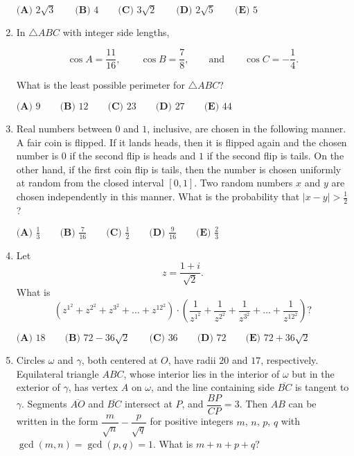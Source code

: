 \documentclass{article}
\begin{document}
\begin{enumerate}[label=\arabic*., itemsep=0.5em]
\(
\textbf{(A) }2\sqrt{3}\qquad
\textbf{(B) }4\qquad
\textbf{(C) }3\sqrt{2}\qquad
\textbf{(D) }2\sqrt{5}\qquad
\textbf{(E) }5\qquad
\)\par \vspace{0.5em}\item In \(\triangle ABC\) with integer side lengths,

\begin{equation*}
\cos A=\frac{11}{16}, \qquad \cos B= \frac{7}{8}, \qquad \text{and} \qquad\cos C=-\frac{1}{4}.
\end{equation*}

What is the least possible perimeter for \(\triangle ABC\)?

\(\textbf{(A) } 9 \qquad \textbf{(B) } 12 \qquad \textbf{(C) } 23 \qquad \textbf{(D) } 27 \qquad \textbf{(E) } 44\)\par \vspace{0.5em}\item Real numbers between \(0\) and \(1\), inclusive, are chosen in the following manner. A fair coin is flipped. If it lands heads, then it is flipped again and the chosen number is \(0\) if the second flip is heads and \(1\) if the second flip is tails. On the other hand, if the first coin flip is tails, then the number is chosen uniformly at random from the closed interval \([0,1]\). Two random numbers \(x\) and \(y\) are chosen independently in this manner. What is the probability that \(|x-y| > \tfrac{1}{2}\)?

\(\textbf{(A) } \frac{1}{3} \qquad \textbf{(B) } \frac{7}{16} \qquad \textbf{(C) } \frac{1}{2} \qquad \textbf{(D) } \frac{9}{16} \qquad \textbf{(E) } \frac{2}{3}\)\par \vspace{0.5em}\item Let 
\begin{equation*}
z=\frac{1+i}{\sqrt{2}}.
\end{equation*}
What is 
\begin{equation*}
\left(z^{1^2}+z^{2^2}+z^{3^2}+\dots+z^{{12}^2}\right) \cdot \left(\frac{1}{z^{1^2}}+\frac{1}{z^{2^2}}+\frac{1}{z^{3^2}}+\dots+\frac{1}{z^{{12}^2}}\right)?
\end{equation*}


\(\textbf{(A) } 18 \qquad \textbf{(B) } 72-36\sqrt2 \qquad \textbf{(C) } 36 \qquad \textbf{(D) } 72 \qquad \textbf{(E) } 72+36\sqrt2\)\par \vspace{0.5em}\item Circles \(\omega\) and \(\gamma\), both centered at \(O\), have radii \(20\) and \(17\), respectively. Equilateral triangle \(ABC\), whose interior lies in the interior of \(\omega\) but in the exterior of \(\gamma\), has vertex \(A\) on \(\omega\), and the line containing side \(\overline{BC}\) is tangent to \(\gamma\). Segments \(\overline{AO}\) and \(\overline{BC}\) intersect at \(P\), and \(\dfrac{BP}{CP} = 3\). Then \(AB\) can be written in the form \(\dfrac{m}{\sqrt{n}} - \dfrac{p}{\sqrt{q}}\) for positive integers \(m\), \(n\), \(p\), \(q\) with \(\gcd(m,n) = \gcd(p,q) = 1\). What is \(m+n+p+q\)?
\(\phantom{  }\)


\end{enumerate}
\end{document}
